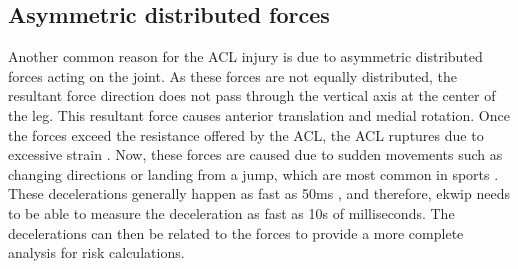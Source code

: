 \subsection{Asymmetric distributed forces}
Another common reason for the ACL injury is due to asymmetric distributed forces acting on the joint. As these forces are not equally distributed, the resultant force direction does not pass through the vertical axis at the center of the leg. This resultant force causes anterior translation and medial rotation. Once the forces exceed the resistance offered by the ACL,  the ACL ruptures due to excessive strain \cite{griffin}. Now, these forces are caused due to sudden movements such as changing directions or landing from a jump, which are most common in sports \cite{griffin}. These decelerations generally happen as fast as 50ms \cite{Shin20071145}, and therefore, ekwip needs to be able to measure the deceleration as fast as 10s of milliseconds. The decelerations can then be related to the forces to provide a more complete analysis for risk calculations.